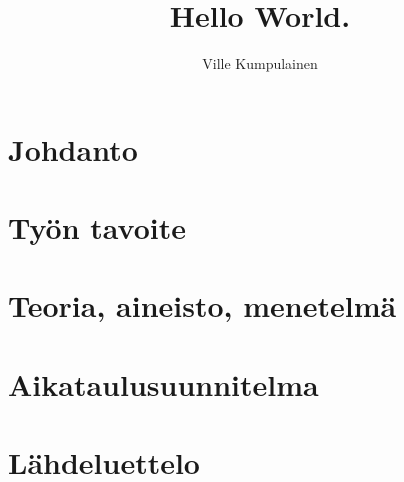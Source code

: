 \documentclass[12pt]{article}
\title{Hello World.}
\author{Ville Kumpulainen}
\begin{document}

\tableofcontents

\section{Johdanto}
\section{Työn tavoite}
\section{Teoria, aineisto, menetelmä}
\section{Aikataulusuunnitelma}
\section*{Lähdeluettelo}
\end{document}
